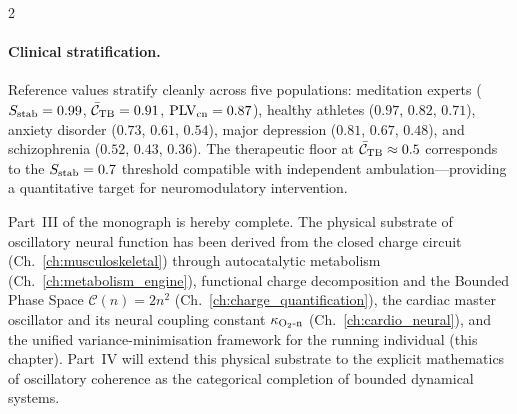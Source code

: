 \begin{multicols}{2}
\paragraph{Clinical stratification.}
Reference values stratify cleanly across five populations: meditation experts ($S_{\mathrm{stab}} = 0.99$, $\bar{\mathcal{C}}_{\mathrm{TB}} = 0.91$, $\mathrm{PLV}_{\mathrm{cn}} = 0.87$), healthy athletes ($0.97$, $0.82$, $0.71$), anxiety disorder ($0.73$, $0.61$, $0.54$), major depression ($0.81$, $0.67$, $0.48$), and schizophrenia ($0.52$, $0.43$, $0.36$). The therapeutic floor at $\bar{\mathcal{C}}_{\mathrm{TB}} \approx 0.5$ corresponds to the $S_{\mathrm{stab}} = 0.7$ threshold compatible with independent ambulation---providing a quantitative target for neuromodulatory intervention.

Part~III of the monograph is hereby complete. The physical substrate of oscillatory neural function has been derived from the closed charge circuit (Ch.~\ref{ch:musculoskeletal}) through autocatalytic metabolism (Ch.~\ref{ch:metabolism_engine}), functional charge decomposition and the Bounded Phase Space $\mathcal{C}(n) = 2n^2$ (Ch.~\ref{ch:charge_quantification}), the cardiac master oscillator and its neural coupling constant $\kappa_{\mathrm{O_2\text{-}n}}$ (Ch.~\ref{ch:cardio_neural}), and the unified variance-minimisation framework for the running individual (this chapter). Part~IV will extend this physical substrate to the explicit mathematics of oscillatory coherence as the categorical completion of bounded dynamical systems.

\end{multicols}
